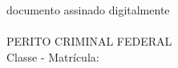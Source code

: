 \bigskip
\begin{center}
	documento assinado digitalmente\\
	\bigskip
	\textbf{\MakeUppercase{\pfauthor}}\\
	PERITO CRIMINAL FEDERAL\\
	Classe \pfauthorclass - Matrícula: \pfauthormatr
\end{center}
